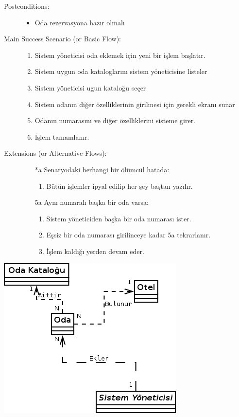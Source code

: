 \documentclass[12pt,a4paper]{report}
\begin{document}
\begin{description}
\item[Postconditions:] \hspace{10mm}
\begin{itemize}
\item Oda rezervasyona hazır olmalı
\end{itemize}
\item[Main Success Scenario (or Basic Flow):] \hspace{10mm}
\begin{enumerate}
\item Sistem yöneticisi oda eklemek için yeni bir işlem başlatır.
\item Sistem uygun oda kataloglarını sistem yöneticisine listeler
\item Sistem yöneticisi ugun kataloğu seçer
\item Sistem odanın diğer özelliklerinin girilmesi için gerekli ekranı sunar
\item Odanın numarasını ve diğer özelliklerini sisteme girer.
\item İşlem tamamlanır.
\end{enumerate}
\item[Extensions (or Alternative Flows):] \hspace{10mm}
\begin{itemize}
\item[*a] Senaryodaki herhangi bir ölümcül hatada:
    \begin{enumerate}
    \item Bütün işlemler ipyal edilip her şey baştan yazılır.
    \end{enumerate}
\item[5a] Aynı numaralı başka bir oda varsa:
    \begin{enumerate}
    \item Sistem yöneticiden başka bir oda numarası ister.
    \item Eşsiz bir oda numarası girilinceye kadar 5a tekrarlanır.
    \item İşlem kaldığı yerden devam eder.
    \end{enumerate}
\end{itemize}
\end{description}
\begin{center}
\includegraphics{dia/usecase3.png}
\end{center}
\end{document}
